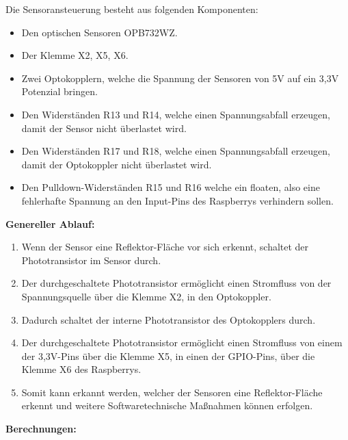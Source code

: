 Die Sensoransteuerung besteht aus folgenden Komponenten:
\begin{itemize}
\item Den optischen Sensoren OPB732WZ.
\item Der Klemme X2, X5, X6. 
\item Zwei Optokopplern, welche die Spannung der Sensoren von 5V auf ein 3,3V Potenzial bringen.
\item Den Widerständen R13 und R14, welche einen Spannungsabfall erzeugen, damit der Sensor nicht überlastet wird.
\item Den Widerständen R17 und R18, welche einen Spannungsabfall erzeugen, damit der Optokoppler nicht überlastet wird.
\item Den Pulldown-Widerständen R15 und R16 welche ein floaten, also eine fehlerhafte Spannung an den Input-Pins des Raspberrys verhindern sollen.\\
\end{itemize}
\textbf{Genereller Ablauf:}
\begin{enumerate}
\item Wenn der Sensor eine Reflektor-Fläche vor sich erkennt, schaltet der Phototransistor im Sensor durch.
\item Der durchgeschaltete Phototransistor ermöglicht einen Stromfluss von der Spannungsquelle über die Klemme X2, in den Optokoppler.
\item Dadurch schaltet der interne Phototransistor des Optokopplers durch.
\item Der durchgeschaltete Phototransistor ermöglicht einen Stromfluss von einem der 3,3V-Pins über die Klemme X5, in einen der GPIO-Pins, über die Klemme X6 des Raspberrys.
\item Somit kann erkannt werden, welcher der Sensoren eine Reflektor-Fläche erkennt und weitere Softwaretechnische Maßnahmen können erfolgen.
\end{enumerate}
\textbf{Berechnungen:}
